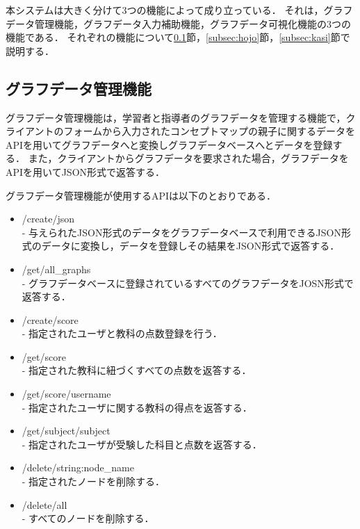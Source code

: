 本システムは大きく分けて3つの機能によって成り立っている．
それは，グラフデータ管理機能，グラフデータ入力補助機能，グラフデータ可視化機能の3つの機能である．
それぞれの機能について\ref{subsec:kanri}節，\ref{subsec:hojo}節，\ref{subsec:kasi}節で説明する．

\subsection{グラフデータ管理機能}\label{subsec:kanri}
グラフデータ管理機能は，学習者と指導者のグラフデータを管理する機能で，クライアントのフォームから入力されたコンセプトマップの親子に関するデータをAPIを用いてグラフデータへと変換しグラフデータベースへとデータを登録する．
また，クライアントからグラフデータを要求された場合，グラフデータをAPIを用いてJSON形式で返答する．

グラフデータ管理機能が使用するAPIは以下のとおりである．

\begin{itemize}
    \item /create/json \\
    - 与えられたJSON形式のデータをグラフデータベースで利用できるJSON形式のデータに変換し，データを登録しその結果をJSON形式で返答する．

    \item /get/all\_graphs \\
    - グラフデータベースに登録されているすべてのグラフデータをJOSN形式で返答する．

    \item /create/score \\
    - 指定されたユーザと教科の点数登録を行う．

    \item /get/score \\
    - 指定された教科に紐づくすべての点数を返答する．

    \item /get/score/\<username\> \\
    - 指定されたユーザに関する教科の得点を返答する．

    \item /get/subject/\<subject\> \\
    - 指定されたユーザが受験した科目と点数を返答する．

    \item /delete/\<string:node\_name\> \\
    - 指定されたノードを削除する．

    \item /delete/all \\
    - すべてのノードを削除する．
    
\end{itemize}

